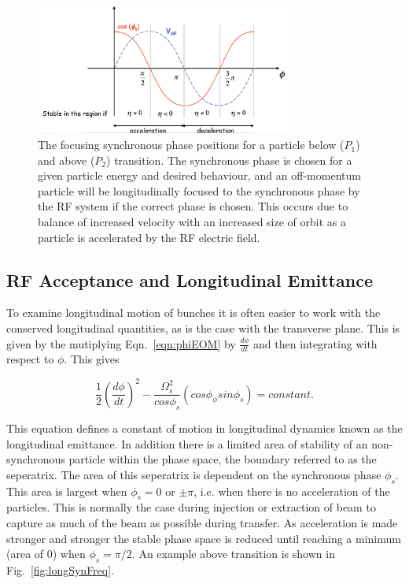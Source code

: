 \begin{figure}
\begin{center}
\includegraphics[width=0.75\textwidth]{appendices/figures/longStab.png}
\end{center}
\caption{The focusing synchronous phase positions for a particle below ($P_{1}$) and above ($P_{2}$) transition. The synchronous phase is chosen for a given particle energy and desired behaviour, and an off-momentum particle will be longitudinally focused to the synchronous phase by the RF system if the correct phase is chosen. This occurs due to balance of increased velocity with an increased size of orbit as a particle is accelerated by the RF electric field.}
\label{fig:longPhase}
\end{figure}

\subsection{RF Acceptance and Longitudinal Emittance}

To examine longitudinal motion of bunches it is often easier to work with the conserved longitudinal quantities, as is the case with the transverse plane. This is given by the mutiplying Eqn.~\ref{eqn:phiEOM} by $\frac{d\phi}{dt}$ and then integrating with respect to $\phi$. This gives

\begin{equation}
\frac{1}{2}\left( \frac{d\phi}{dt} \right)^{2} - \frac{\Omega_{s}^{2}}{cos\phi_{s}} \left( cos\phi _ \phi sin\phi_{s} \right) = constant.
\end{equation} 

This equation defines a constant of motion in longitudinal dynamics known as the longitudinal emittance. In addition there is a limited area of stability of an non-synchronous particle within the phase space, the boundary referred to as the seperatrix. The area of this seperatrix is dependent on the synchronous phase $\phi_{s}$. This area is largest when $\phi_{s}=0$ or $\pm \pi$, i.e. when there is no acceleration of the particles. This is normally the case during injection or extraction of beam to capture as much of the beam as possible during transfer. As acceleration is made stronger and stronger the stable phase space is reduced until reaching a minimum (area of $0$) when $\phi_{s}=\pi /2$. An example above transition is shown in Fig.~\ref{fig:longSynFreq}.

